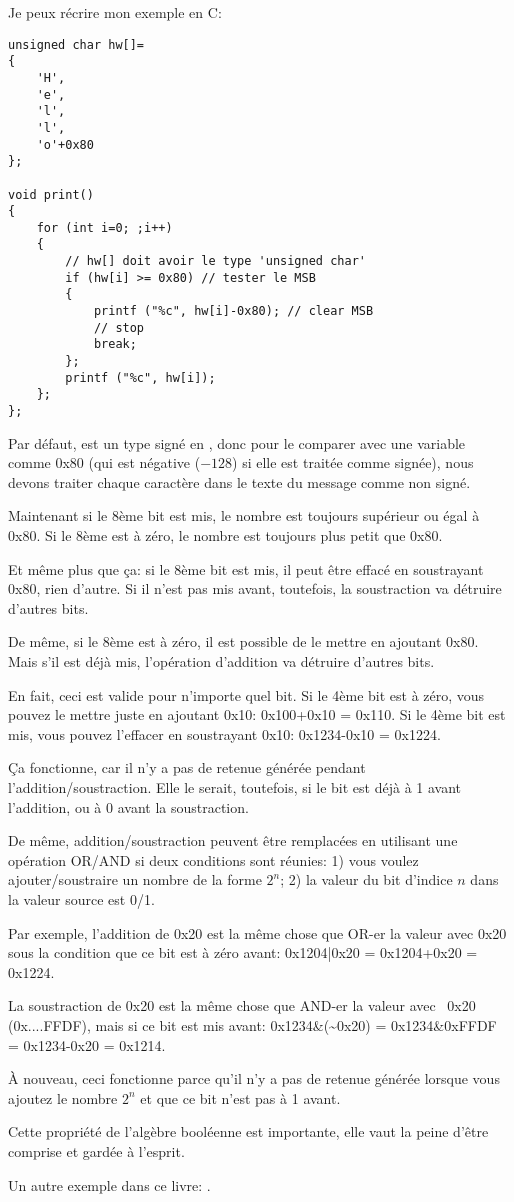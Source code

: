 Je peux récrire mon exemple en C:

\begin{lstlisting}[style=customc]
unsigned char hw[]=
{
	'H',
	'e',
	'l',
	'l',
	'o'+0x80
};

void print()
{
	for (int i=0; ;i++)
	{
		// hw[] doit avoir le type 'unsigned char'
		if (hw[i] >= 0x80) // tester le MSB
		{
			printf ("%c", hw[i]-0x80); // clear MSB
			// stop
			break;
		};
		printf ("%c", hw[i]);
	};
};
\end{lstlisting}

Par défaut,  est un type signé en \CCpp, donc pour le comparer avec une
variable comme 0x80 (qui est négative ($-128$) si elle est traitée comme signée),
nous devons traiter chaque caractère dans le texte du message comme non signé.

Maintenant si le 8ème bit est mis, le nombre est toujours supérieur ou égal à
0x80.
Si le 8ème est à zéro, le nombre est toujours plus petit que 0x80.

Et même plus que ça: si le 8ème bit est mis, il peut être effacé en soustrayant 0x80,
rien d'autre.
Si il n'est pas mis avant, toutefois, la soustraction va détruire d'autres bits.

De même, si le 8ème est à zéro, il est possible de le mettre en ajoutant 0x80.
Mais s'il est déjà mis, l'opération d'addition va détruire d'autres bits.

En fait, ceci est valide pour n'importe quel bit.
Si le 4ème bit est à zéro, vous pouvez le mettre juste en ajoutant 0x10: 0x100+0x10 = 0x110.
Si le 4ème bit est mis, vous pouvez l'effacer en soustrayant 0x10: 0x1234-0x10 = 0x1224.

Ça fonctionne, car il n'y a pas de retenue générée pendant l'addition/soustraction.
Elle le serait, toutefois, si le bit est déjà à 1 avant l'addition, ou à 0 avant
la soustraction.

De même, addition/soustraction peuvent être remplacées en utilisant une opération
OR/AND si deux conditions sont réunies:
1) vous voulez ajouter/soustraire un nombre de la forme $2^n$;
2) la valeur du bit d'indice $n$ dans la valeur source est 0/1.

Par exemple, l'addition de 0x20 est la même chose que OR-er la valeur avec 0x20 sous
la condition que ce bit est à zéro avant:
0x1204|0x20 = 0x1204+0x20 = 0x1224.

La soustraction de 0x20 est la même chose que AND-er la valeur avec ~0x20 (0x....FFDF),
mais si ce bit est mis avant:
0x1234\&(\~{}0x20) = 0x1234\&0xFFDF = 0x1234-0x20 = 0x1214.

À nouveau, ceci fonctionne parce qu'il n'y a pas de retenue générée lorsque vous ajoutez
le nombre $2^n$ et que ce bit n'est pas à 1 avant.

Cette propriété de l'algèbre booléenne est importante, elle vaut la peine d'être comprise
et gardée à l'esprit.

Un autre exemple dans ce livre: .

